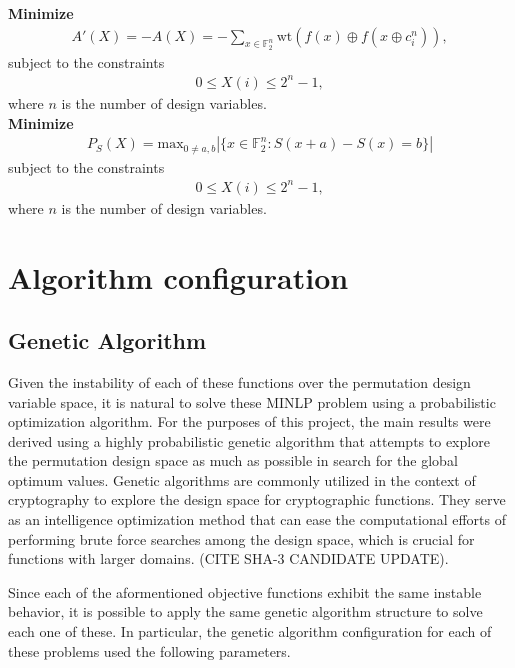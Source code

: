 \documentclass[11pt]{article}
\newcommand{\field}[1]{\mathbb{#1}} %
\begin{document}
\textbf{Minimize}
\begin{eqnarray*}
A'(X) = -A(X) = -\sum_{x \in \field{F}_2^n} \text{wt}(f(x) \oplus f(x \oplus c_{i}^{n})),
\end{eqnarray*}
subject to the constraints
\begin{eqnarray*}
0 \leq X(i) \leq 2^{n} - 1,
\end{eqnarray*}
where $n$ is the number of design variables. \\

\textbf{Minimize}
\begin{eqnarray*}
P_S(X) = \text{max}_{0 \not= a, b}|\{x \in \field{F}_2^n : S(x + a) - S(x) = b\}|
\end{eqnarray*}
subject to the constraints
\begin{eqnarray*}
0 \leq X(i) \leq 2^{n} - 1,
\end{eqnarray*}
where $n$ is the number of design variables. \\

\section{Algorithm configuration}
\subsection{Genetic Algorithm}

Given the instability of each of these functions over the permutation design variable space, it is natural to solve these MINLP problem using a probabilistic optimization algorithm. For the purposes of this project, the main results were derived using a highly probabilistic genetic algorithm that attempts to explore the permutation design space as much as possible in search for the global optimum values. Genetic algorithms are commonly utilized in the context of cryptography to explore the design space for cryptographic functions. They serve as an intelligence optimization method that can ease the computational efforts of performing brute force searches among the design space, which is crucial for functions with larger domains. (CITE SHA-3 CANDIDATE UPDATE).

Since each of the aformentioned objective functions exhibit the same instable behavior, it is possible to apply the same genetic algorithm structure to solve each one of these. In particular, the genetic algorithm configuration for each of these problems used the following parameters.
\end{document}
